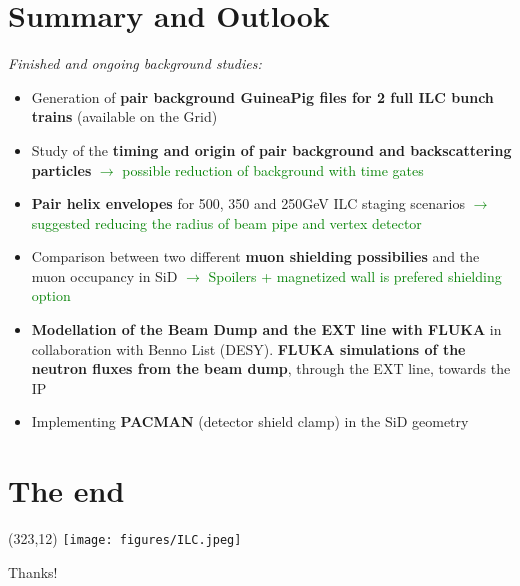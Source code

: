 \documentclass[xcolor={dvipsnames}]{beamer}
\newcommand{\ilclogo}{
  \setlength{\TPHorizModule}{1pt}
  \setlength{\TPVertModule}{1pt}
  \begin{textblock}{1}(323,12)
   \texttt{[image: figures/ILC.jpeg]}
  \end{textblock}
}
\begin{document}
\section{Summary and Outlook}
\begin{frame}
\textit{Finished and ongoing background studies:}
 \begin{itemize} 
  \item Generation of \textbf{pair background GuineaPig files for 2 full ILC bunch trains} (available on the Grid)
  \item Study of the \textbf{timing and origin of pair background and backscattering particles} \textcolor{Green}{$\rightarrow$ possible reduction of background with time gates}
  \item \textbf{Pair helix envelopes} for 500, 350 and 250GeV ILC staging scenarios \textcolor{Green}{$\rightarrow$ suggested reducing the radius of beam pipe and vertex detector}
  \item Comparison between two different \textbf{muon shielding possibilies} and the muon occupancy in SiD \textcolor{Green}{$\rightarrow$ Spoilers + magnetized wall is prefered shielding option}
   \item \textbf{Modellation of the Beam Dump and the EXT line with FLUKA} in collaboration with Benno List (DESY). \textbf{FLUKA simulations of the neutron fluxes from the beam dump}, through the EXT line, towards the IP
  \item Implementing \textbf{PACMAN} (detector shield clamp) in the SiD geometry
 \end{itemize}
\end{frame}


\section*{The end}
{
\begin{frame}
\ilclogo
\begin{center}
\vspace*{1cm}
\textcolor{RubineRed}{
	\LARGE Thanks!
}
\end{center}
\end{frame}
}
\end{document}
